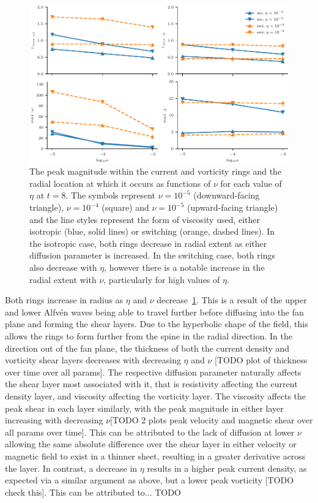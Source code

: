 \begin{figure}[h]
  \centering
  \includegraphics[width=\linewidth]{param_study/peak_mag_and_loc.pdf}
  \caption{The peak magnitude within the current and vorticity rings and the radial location at which it occurs as functions of $\nu$ for each value of $\eta$ at $t=8$. The symbols represent $\nu=10^{-5}$ (downward-facing triangle), $\nu=10^{-4}$ (square) and $\nu=10^{-5}$ (upward-facing triangle) and the line styles represent the form of viscosity used, either isotropic (blue, solid lines) or switching (orange, dashed lines). In the isotropic case, both rings decrease in radial extent as either diffusion parameter is increased. In the switching case, both rings also decrease with $\eta$, however there is a notable increase in the radial extent with $\nu$, particularly for high values of $\eta$.}%
  \label{fig:param_study_peak_mag_and_loc}
\end{figure}

Both rings increase in radius as $\eta$ and $\nu$ decrease~\ref{fig:param_study_peak_mag_and_loc}. This is a result of the upper and lower Alfv\'en waves being able to travel further before diffusing into the fan plane and forming the shear layers. Due to the hyperbolic shape of the field, this allows the rings to form further from the spine in the radial direction. In the direction out of the fan plane, the thickness of both the current density and vorticity shear layers decreases with decreasing $\eta$ and $\nu$ [TODO plot of thickness over time over all params]. The respective diffusion parameter naturally affects the shear layer most associated with it, that is resistivity affecting the current density layer, and viscosity affecting the vorticity layer. The viscosity affects the peak shear in each layer similarly, with the peak magnitude in either layer increasing with decreasing $\nu$[TODO 2 plots peak velocity and magnetic shear over all params over time]. This can be attributed to the lack of diffusion at lower $\nu$ allowing the same absolute difference over the shear layer in either velocity or magnetic field to exist in a thinner sheet, resulting in a greater derivative across the layer. In contrast, a decrease in $\eta$ results in a higher peak current density, as expected via a similar argument as above, but a lower peak vorticity [TODO check this]. This can be attributed to... TODO

